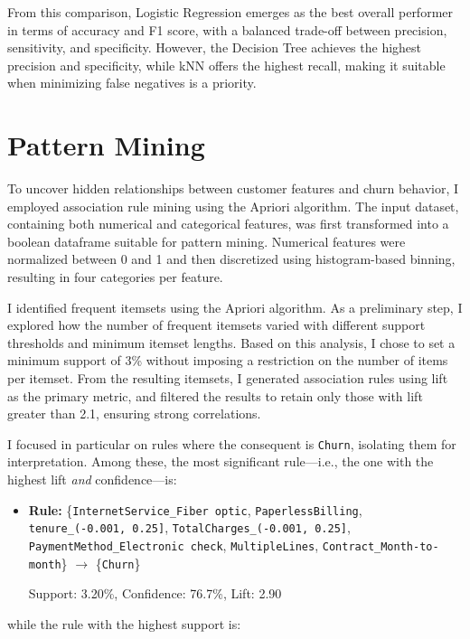 \documentclass[a4paper,11pt]{article}
\begin{document}
From this comparison, Logistic Regression emerges as the best overall performer in terms of accuracy and F1 score, with a balanced trade-off between precision, sensitivity, and specificity. However, the Decision Tree achieves the highest precision and specificity, while kNN offers the highest recall, making it suitable when minimizing false negatives is a priority.

\section{Pattern Mining}

To uncover hidden relationships between customer features and churn behavior, I employed association rule mining using the Apriori algorithm. The input dataset, containing both numerical and categorical features, was first transformed into a boolean dataframe suitable for pattern mining. Numerical features were normalized between 0 and 1 and then discretized using histogram-based binning, resulting in four categories per feature.

I identified frequent itemsets using the Apriori algorithm. As a preliminary step, I explored how the number of frequent itemsets varied with different support thresholds and minimum itemset lengths. Based on this analysis, I chose to set a minimum support of 3\% without imposing a restriction on the number of items per itemset. From the resulting itemsets, I generated association rules using lift as the primary metric, and filtered the results to retain only those with lift greater than 2.1, ensuring strong correlations.

I focused in particular on rules where the consequent is \texttt{Churn}, isolating them for interpretation. Among these, the most significant rule—i.e., the one with the highest lift \textit{and} confidence—is:

\begin{itemize}
\sloppy
    \item \textbf{Rule:} \{\texttt{InternetService\_Fiber optic}, \texttt{PaperlessBilling}, \texttt{tenure\_(-0.001, 0.25]}, \texttt{TotalCharges\_(-0.001, 0.25]}, \texttt{PaymentMethod\_Electronic check}, \texttt{MultipleLines}, \texttt{Contract\_Month-to-month}\} $\rightarrow$ \{\texttt{Churn}\}
    
    Support: 3.20\%, Confidence: 76.7\%, Lift: 2.90
\end{itemize}

while the rule with the highest support is:
\end{document}
